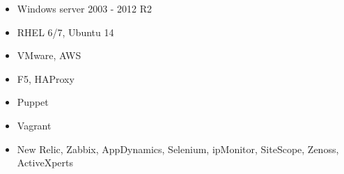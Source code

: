 \begin{multicols}{2}
	\begin{itemize}
		\item Windows server 2003 - 2012 R2
		\item RHEL 6/7, Ubuntu 14
		\item VMware, AWS
		\item F5, HAProxy
		\item Puppet
		\item Vagrant
		\item New Relic, Zabbix, AppDynamics, Selenium, ipMonitor, SiteScope, Zenoss, ActiveXperts
	\end{itemize}
	\vspace*{\fill}
\end{multicols}
